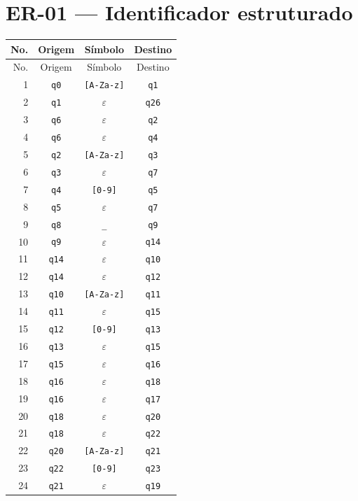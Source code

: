 \documentclass[12pt,a4paper,oneside]{report}
\begin{document}
\section{ER-01 --- Identificador estruturado}
\small
\begin{longtable}{|r|c|c|c|}
\toprule
No. & Origem & Símbolo & Destino \\
\midrule
\endfirsthead
\toprule
No. & Origem & Símbolo & Destino \\
\midrule
\endhead
1 & \texttt{q0} & \texttt{[A-Za-z]} & \texttt{q1} \\
2 & \texttt{q1} & $\varepsilon$ & \texttt{q26} \\
3 & \texttt{q6} & $\varepsilon$ & \texttt{q2} \\
4 & \texttt{q6} & $\varepsilon$ & \texttt{q4} \\
5 & \texttt{q2} & \texttt{[A-Za-z]} & \texttt{q3} \\
6 & \texttt{q3} & $\varepsilon$ & \texttt{q7} \\
7 & \texttt{q4} & \texttt{[0-9]} & \texttt{q5} \\
8 & \texttt{q5} & $\varepsilon$ & \texttt{q7} \\
9 & \texttt{q8} & \texttt{\_} & \texttt{q9} \\
10 & \texttt{q9} & $\varepsilon$ & \texttt{q14} \\
11 & \texttt{q14} & $\varepsilon$ & \texttt{q10} \\
12 & \texttt{q14} & $\varepsilon$ & \texttt{q12} \\
13 & \texttt{q10} & \texttt{[A-Za-z]} & \texttt{q11} \\
14 & \texttt{q11} & $\varepsilon$ & \texttt{q15} \\
15 & \texttt{q12} & \texttt{[0-9]} & \texttt{q13} \\
16 & \texttt{q13} & $\varepsilon$ & \texttt{q15} \\
17 & \texttt{q15} & $\varepsilon$ & \texttt{q16} \\
18 & \texttt{q16} & $\varepsilon$ & \texttt{q18} \\
19 & \texttt{q16} & $\varepsilon$ & \texttt{q17} \\
20 & \texttt{q18} & $\varepsilon$ & \texttt{q20} \\
21 & \texttt{q18} & $\varepsilon$ & \texttt{q22} \\
22 & \texttt{q20} & \texttt{[A-Za-z]} & \texttt{q21} \\
23 & \texttt{q22} & \texttt{[0-9]} & \texttt{q23} \\
24 & \texttt{q21} & $\varepsilon$ & \texttt{q19} \\

\end{longtable}
\end{document}
